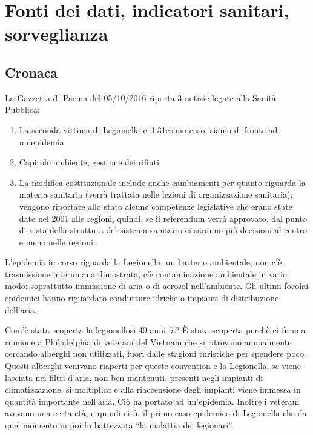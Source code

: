 
\section{Fonti dei dati, indicatori sanitari, sorveglianza}

\subsection{Cronaca}


La Gazzetta di Parma del 05/10/2016 riporta 3 notizie legate alla Sanità
Pubblica:

\begin{enumerate}
\def\labelenumi{\arabic{enumi}.}
\item
  La seconda vittima di Legionella e il 31esimo caso, siamo di fronte ad
  un'epidemia
\item
  Capitolo ambiente, gestione dei rifiuti
\item
  La modifica costituzionale include anche cambiamenti per quanto
  riguarda la materia sanitaria (verrà trattata nelle lezioni di
  organizzazione sanitaria); vengono riportate allo stato alcune
  competenze legislative che erano state date nel 2001 alle regioni,
  quindi, se il referendum verrà approvato, dal punto di vista della
  struttura del sistema sanitario ci saranno più decisioni al centro e
  meno nelle regioni
\end{enumerate}

L'epidemia in corso riguarda la Legionella, un batterio ambientale, non
c'è trasmissione interumana dimostrata, c'è contaminazione ambientale in
vario modo: soprattutto immissione di aria o di aerosol nell'ambiente.
Gli ultimi focolai epidemici hanno riguardato condutture idriche o
impianti di distribuzione dell'aria.

Com'è stata scoperta la legionellosi 40 anni fa? È stata scoperta perchè
ci fu una riunione a Philadelphia di veterani del Vietnam che si
ritrovano annualmente cercando alberghi non utilizzati, fuori dalle
stagioni turistiche per spendere poco. Questi alberghi venivano riaperti
per queste convention e la Legionella, se viene lasciata nei filtri
d'aria, non ben mantenuti, presenti negli impianti di climatizzazione,
si moltiplica e alla riaccensione degli impianti viene immessa in
quantità importante nell'aria. Ciò ha portato ad un'epidemia. Inoltre i
veterani avevano una certa età, e quindi ci fu il primo caso epidemico
di Legionella che da quel momento in poi fu battezzata ``la malattia dei
legionari''.

